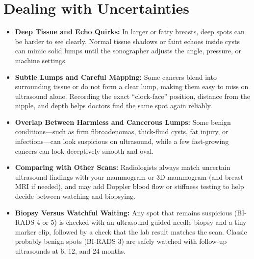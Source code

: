 \section{Dealing with Uncertainties}
\begin{itemize}
\item \textbf{Deep Tissue and Echo Quirks:} In larger or fatty breasts, deep spots can be harder to see clearly. Normal tissue shadows or faint echoes inside cysts can mimic solid lumps until the sonographer adjusts the angle, pressure, or machine settings.
\item \textbf{Subtle Lumps and Careful Mapping:} Some cancers blend into surrounding tissue or do not form a clear lump, making them easy to miss on ultrasound alone. Recording the exact ``clock-face'' position, distance from the nipple, and depth helps doctors find the same spot again reliably.
\item \textbf{Overlap Between Harmless and Cancerous Lumps:} Some benign conditions---such as firm fibroadenomas, thick-fluid cysts, fat injury, or infections---can look suspicious on ultrasound, while a few fast-growing cancers can look deceptively smooth and oval.
\item \textbf{Comparing with Other Scans:} Radiologists always match uncertain ultrasound findings with your mammogram or 3D mammogram (and breast MRI if needed), and may add Doppler blood flow or stiffness testing to help decide between watching and biopsying.
\item \textbf{Biopsy Versus Watchful Waiting:} Any spot that remains suspicious (BI-RADS 4 or 5) is checked with an ultrasound-guided needle biopsy and a tiny marker clip, followed by a check that the lab result matches the scan. Classic probably benign spots (BI-RADS 3) are safely watched with follow-up ultrasounds at 6, 12, and 24 months.
\end{itemize}

